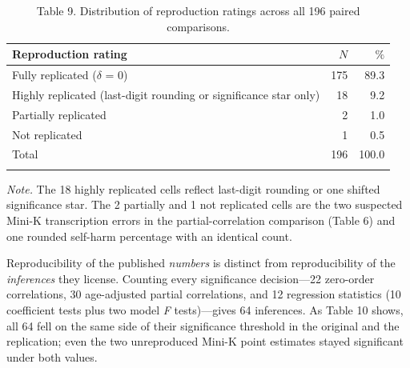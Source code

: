 \documentclass[
  english,
  man,floatsintext]{apa6}
\begin{document}
\begin{table}[tbp]

\begin{center}
\begin{threeparttable}

\caption{\label{tab:tab-rating}Table 9. Distribution of reproduction ratings across all 196 paired comparisons.}

\begin{tabular}{lrr}
\toprule
Reproduction rating & $N$ & $\%$\\
\midrule
Fully replicated ($\delta$ = 0) & 175 & 89.3\\
Highly replicated (last-digit rounding or significance star only) & 18 & 9.2\\
Partially replicated & 2 & 1.0\\
Not replicated & 1 & 0.5\\
Total & 196 & 100.0\\
\bottomrule
\addlinespace
\end{tabular}

\begin{tablenotes}[para]
\normalsize{\textit{Note.} The 18 highly replicated cells reflect last-digit rounding or one shifted significance star. The 2 partially and 1 not replicated cells are the two suspected Mini-K transcription errors in the partial-correlation comparison (Table 6) and one rounded self-harm percentage with an identical count.}
\end{tablenotes}

\end{threeparttable}
\end{center}

\end{table}

Reproducibility of the published \emph{numbers} is distinct from reproducibility of the \emph{inferences} they license. Counting every significance decision---22 zero-order correlations, 30 age-adjusted partial correlations, and 12 regression statistics (10 coefficient tests plus two model \emph{F} tests)---gives 64 inferences. As Table 10 shows, all 64 fell on the same side of their significance threshold in the original and the replication; even the two unreproduced Mini-K point estimates stayed significant under both values.
\end{document}
